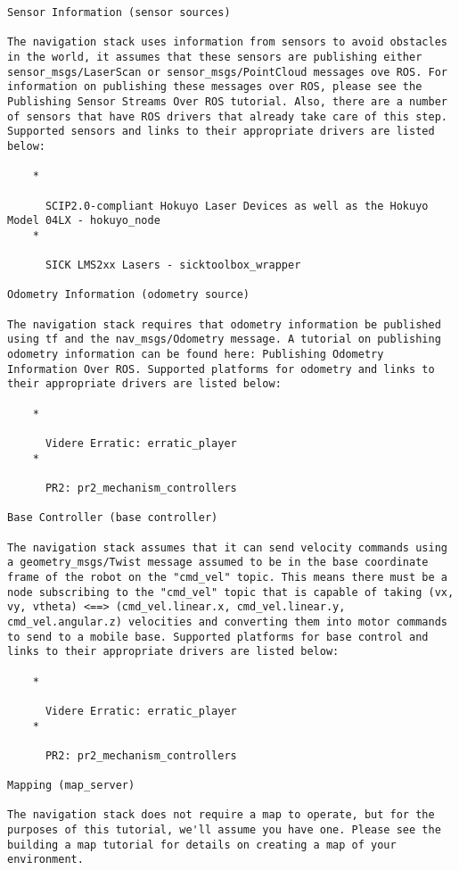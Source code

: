 \begin{verbatim}
Sensor Information (sensor sources)

The navigation stack uses information from sensors to avoid obstacles in the world, it assumes that these sensors are publishing either sensor_msgs/LaserScan or sensor_msgs/PointCloud messages ove ROS. For information on publishing these messages over ROS, please see the Publishing Sensor Streams Over ROS tutorial. Also, there are a number of sensors that have ROS drivers that already take care of this step. Supported sensors and links to their appropriate drivers are listed below:

    *

      SCIP2.0-compliant Hokuyo Laser Devices as well as the Hokuyo Model 04LX - hokuyo_node
    *

      SICK LMS2xx Lasers - sicktoolbox_wrapper 

Odometry Information (odometry source)

The navigation stack requires that odometry information be published using tf and the nav_msgs/Odometry message. A tutorial on publishing odometry information can be found here: Publishing Odometry Information Over ROS. Supported platforms for odometry and links to their appropriate drivers are listed below:

    *

      Videre Erratic: erratic_player
    *

      PR2: pr2_mechanism_controllers 

Base Controller (base controller)

The navigation stack assumes that it can send velocity commands using a geometry_msgs/Twist message assumed to be in the base coordinate frame of the robot on the "cmd_vel" topic. This means there must be a node subscribing to the "cmd_vel" topic that is capable of taking (vx, vy, vtheta) <==> (cmd_vel.linear.x, cmd_vel.linear.y, cmd_vel.angular.z) velocities and converting them into motor commands to send to a mobile base. Supported platforms for base control and links to their appropriate drivers are listed below:

    *

      Videre Erratic: erratic_player
    *

      PR2: pr2_mechanism_controllers 

Mapping (map_server)

The navigation stack does not require a map to operate, but for the purposes of this tutorial, we'll assume you have one. Please see the building a map tutorial for details on creating a map of your environment.


\end{verbatim}
